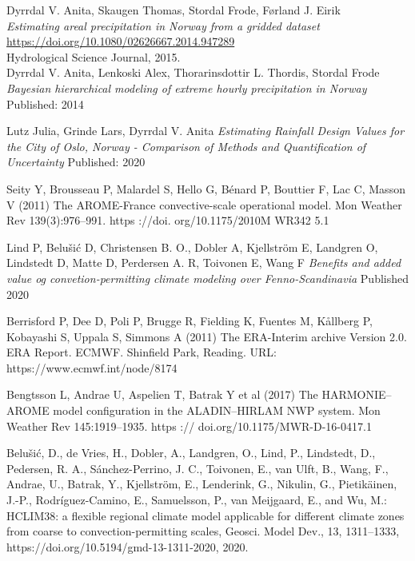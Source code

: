 \begin{thebibliography}{9}

Dyrrdal V. Anita, Skaugen Thomas, Stordal Frode, Førland J. Eirik \\
\textit{Estimating areal precipitation in Norway from a gridded dataset}\\
\url{https://doi.org/10.1080/02626667.2014.947289} \\
Hydrological Science Journal, 2015.\\

Dyrrdal V. Anita, Lenkoski Alex, Thorarinsdottir L. Thordis, Stordal Frode
\textit{Bayesian hierarchical modeling of extreme hourly precipitation in Norway}
Published: 2014

Lutz Julia, Grinde Lars, Dyrrdal V. Anita
\textit{Estimating Rainfall Design Values for the City of Oslo, Norway - Comparison of Methods and Quantification of Uncertainty}
Published: 2020

Seity Y, Brousseau P, Malardel S, Hello G, Bénard P, Bouttier F,
Lac C, Masson V (2011) The AROME-France convective-scale
operational model. Mon Weather Rev 139(3):976–991. https ://doi.
org/10.1175/2010M WR342 5.1

Lind P, Belušić D, Christensen B. O., Dobler A, Kjellström E, Landgren O, Lindstedt D, Matte D, Perdersen A. R, Toivonen E, Wang F
\textit{Benefits and added value og convetion-permitting climate modeling over Fenno-Scandinavia}
Published 2020

Berrisford P, Dee D, Poli P, Brugge R, Fielding K, Fuentes M, Kållberg P, Kobayashi S, Uppala S, Simmons A (2011)
The ERA-Interim archive Version 2.0. ERA Report. ECMWF. Shinfield Park, Reading. URL: https://www.ecmwf.int/node/8174

Bengtsson L, Andrae U, Aspelien T, Batrak Y et al (2017) The HARMONIE–
AROME model configuration in the ALADIN–HIRLAM
NWP system. Mon Weather Rev 145:1919–1935. https ://
doi.org/10.1175/MWR-D-16-0417.1

Belušić, D., de Vries, H., Dobler, A., Landgren, O., Lind, P., Lindstedt, D., Pedersen, R. A., Sánchez-Perrino, J. C., Toivonen, E., van Ulft, B., Wang, F., Andrae, U., Batrak, Y., Kjellström, E., Lenderink, G., Nikulin, G., Pietikäinen, J.-P., Rodríguez-Camino, E., Samuelsson, P., van Meijgaard, E., and Wu, M.: HCLIM38: a flexible regional climate model applicable for different climate zones from coarse to convection-permitting scales, Geosci. Model Dev., 13, 1311–1333, https://doi.org/10.5194/gmd-13-1311-2020, 2020.


\end{thebibliography}
